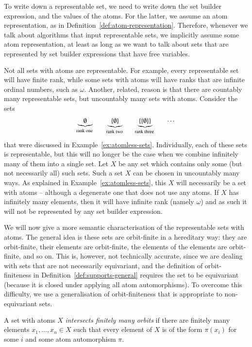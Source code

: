 To write down a representable set, we need to write down the set builder expression, and the values of the atoms. For the latter, we assume an atom representation, as in Definition~\ref{def:atom-representation}. Therefore, whenever we talk about algorithms that input representable sets, we implicitly assume some atom representation, at least as long as we want to talk about sets that are represented by set builder expressions that have free variables.

Not all sets with atoms  are representable. For example, every representable set will have finite rank, while some sets with atoms will have ranks that are infinite ordinal numbers, such as $\omega$. Another, related,  reason is that there are countably many representable sets, but uncountably many sets with atoms. Consider the sets 
	\begin{align*}
	\myunderbrace{ \emptyset }{rank one}
	\qquad 
	\myunderbrace{ \set{ \emptyset }}{rank two}
	\qquad
	\myunderbrace{ \set{ \set{\emptyset}}}{rank three} 
	\qquad \cdots
	\end{align*}
that were discussed in Example~\ref{ex:atomless-sets}.  Individually, each of these sets is representable, but this will no longer be the case when we combine infinitely many of them into a single set. Let $X$ be any set which contains only some (but not necessarily all) such sets. Such a set $X$ can be chosen in uncountably many ways. As explained in Example~\ref{ex:atomless-sets}, this $X$ will necessarily be  a set with atoms -- although a degenerate one that does not use any atoms. If $X$ has infinitely many elements, then it will have infinite rank (namely $\omega$) and as such it will not be represented by any set builder expression.  

We will now give a more semantic characterisation of the representable sets with atoms.   The general idea is these sets are orbit-finite in a hereditary way: they are orbit-finite,  their elements are orbit-finite,  the elements of the elements are orbit-finite, and so on. This is, however, not technically accurate, since we are dealing with sets that are not necessarily equivariant, and the definition of orbit-finiteness in Definition~\ref{def:supports-general} requires the set to be equivariant (because it is closed under applying all atom automorphisms). To overcome this difficulty, we use a generalisation of orbit-finiteness that is appropriate to non-equivariant sets. 

\begin{definition}\label{def:intersects-finitely-many-orbits}
	A set with atoms $X$ \emph{intersects finitely many orbits} if  there are finitely many elements $x_1,\ldots,x_n \in X$ such that every element of $X$ is of the form $\pi(x_i)$ for some $i$ and some atom automorphism $\pi$.
\end{definition}

